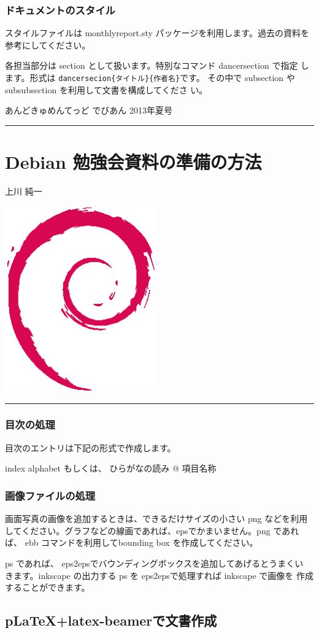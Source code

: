 \documentclass[mingoth,a4paper]{jsarticle}
\renewcommand{\dancersection}[2]{%
\newpage
あんどきゅめんてっど でびあん 2013年夏号
%
\vspace{0.1mm}\\
{\color{dancerdarkblue}\rule{\hsize}{2mm}}

%
%
\begin{minipage}[t]{0.6\hsize}
\color{dancerdarkblue}
\vspace{1cm}
\section{#1}
\hfill{}#2\\
\end{minipage}
\begin{minipage}[t]{0.4\hsize}
\vspace{-2cm}
\hfill{}\includegraphics[height=8cm]{image200502/openlogo-nd.eps}\\
\vspace{-5cm}
\end{minipage}
%
{\color{dancerlightblue}\rule{0.66\hsize}{2mm}}
%
\vspace{2cm}
}
\begin{document}
\subsubsection{ドキュメントのスタイル}

スタイルファイルは monthlyreport.sty パッケージを利用します。過去の資料を参考にしてください。

\begin{commandline}
\usepackage{monthlyreport} 
\end{commandline}

各担当部分は section として扱います。特別なコマンド dancersection で指定
します。形式は \texttt{dancersecion\{タイトル\}\{作者名\}}です。
その中で subsection や subsubsection を利用して文書を構成してくださ
い。

\begin{commandline}
 \dancersection{Debian 勉強会資料の準備の方法}{上川 純一}
 \label{sec:debmtg2007howtoprepare}
\end{commandline}

\subsubsection{目次の処理}

目次のエントリは下記の形式で作成します。
\begin{commandline}
index { alphabet もしくは、 ひらがなの読み @ 項目名称 } 
\end{commandline}

\subsubsection{画像ファイルの処理}

画面写真の画像を追加するときは、できるだけサイズの小さい png などを利用
してください。グラフなどの線画であれば、epsでかまいません。png であれば、 
ebb コマンドを利用してbounding box を作成してください。


ps であれば、 eps2epsでバウンディングボックスを追加してあげるとうまくい
きます。inkscape の出力する ps を eps2epsで処理すれば inkscape で画像を
作成することができます。

\subsection{pLaTeX+latex-beamerで文書作成}
\end{document}
